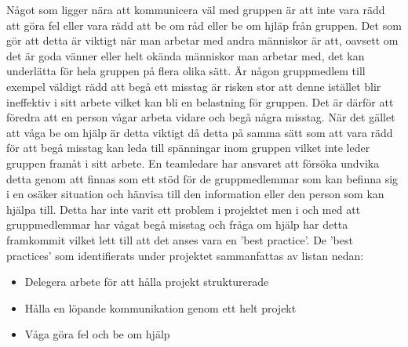 \newline \newline
Något som ligger nära att kommunicera väl med gruppen är att inte vara rädd att göra fel eller vara rädd att be om råd eller be om hjläp från gruppen. Det som gör att detta är viktigt när man arbetar med andra människor är att, oavsett om det är goda vänner eller helt okända människor man arbetar med, det kan underlätta för hela gruppen på flera olika sätt. Är någon gruppmedlem till exempel väldigt rädd att begå ett misstag är risken stor att denne istället blir ineffektiv i sitt arbete vilket kan bli en belastning för gruppen. Det är därför att föredra att en person vågar arbeta vidare och begå några misstag. När det gället att våga be om hjälp är detta viktigt då detta på samma sätt som att vara rädd för att begå misstag kan leda till spänningar inom gruppen vilket inte leder gruppen framåt i sitt arbete. En teamledare har ansvaret att försöka undvika detta genom att finnas som ett stöd för de gruppmedlemmar som kan befinna sig i en osäker situation och hänvisa till den information eller den person som kan hjälpa till. Detta har inte varit ett problem i projektet men i och med att gruppmedlemmar har vågat begå misstag och fråga om hjälp har detta framkommit vilket lett till att det anses vara en 'best practice'.
\newline \newline
De 'best practices' som identifierats under projektet sammanfattas av listan nedan:
\begin{itemize}
	\item Delegera arbete för att hålla projekt strukturerade
	\item Hålla en löpande kommunikation genom ett helt projekt
	\item Våga göra fel och be om hjälp
\end{itemize}